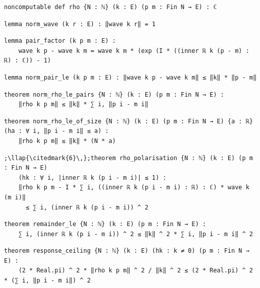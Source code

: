 \begin{lstlisting}[style=leancat]
noncomputable def rho {N : ℕ} (k : E) (p m : Fin N → E) : ℂ
\end{lstlisting}

\begin{lstlisting}[style=leancat]
lemma norm_wave (k r : E) : ‖wave k r‖ = 1
\end{lstlisting}

\begin{lstlisting}[style=leancat]
lemma pair_factor (k p m : E) :
    wave k p - wave k m = wave k m * (exp (I * ((inner ℝ k (p - m) : ℝ) : ℂ)) - 1)
\end{lstlisting}

\begin{lstlisting}[style=leancat]
lemma norm_pair_le (k p m : E) : ‖wave k p - wave k m‖ ≤ ‖k‖ * ‖p - m‖
\end{lstlisting}

\begin{lstlisting}[style=leancat]
theorem norm_rho_le_pairs {N : ℕ} (k : E) (p m : Fin N → E) :
    ‖rho k p m‖ ≤ ‖k‖ * ∑ i, ‖p i - m i‖
\end{lstlisting}

\begin{lstlisting}[style=leancat]
theorem norm_rho_le_of_size {N : ℕ} (k : E) (p m : Fin N → E) {a : ℝ} (ha : ∀ i, ‖p i - m i‖ ≤ a) :
    ‖rho k p m‖ ≤ ‖k‖ * (N * a)
\end{lstlisting}

\begin{lstlisting}[style=leancat]
;\llap{\citedmark{6}\,};theorem rho_polarisation {N : ℕ} (k : E) (p m : Fin N → E)
    (hk : ∀ i, |inner ℝ k (p i - m i)| ≤ 1) :
    ‖rho k p m - I * ∑ i, ((inner ℝ k (p i - m i) : ℝ) : ℂ) * wave k (m i)‖
      ≤ ∑ i, (inner ℝ k (p i - m i)) ^ 2
\end{lstlisting}

\begin{lstlisting}[style=leancat]
theorem remainder_le {N : ℕ} (k : E) (p m : Fin N → E) :
    ∑ i, (inner ℝ k (p i - m i)) ^ 2 ≤ ‖k‖ ^ 2 * ∑ i, ‖p i - m i‖ ^ 2
\end{lstlisting}

\begin{lstlisting}[style=leancat]
theorem response_ceiling {N : ℕ} (k : E) (hk : k ≠ 0) (p m : Fin N → E) :
    (2 * Real.pi) ^ 2 * ‖rho k p m‖ ^ 2 / ‖k‖ ^ 2 ≤ (2 * Real.pi) ^ 2 * (∑ i, ‖p i - m i‖) ^ 2
\end{lstlisting}


